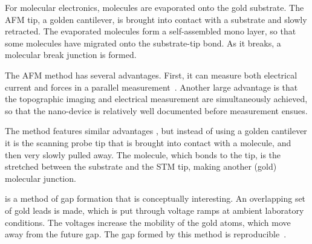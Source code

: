 For molecular electronics, molecules are evaporated onto the gold substrate. The AFM tip, a golden cantilever, is brought into contact with a substrate and slowly retracted. The evaporated molecules form a self-assembled mono layer, so that some molecules have migrated onto the substrate-tip bond. As it breaks, a molecular break junction is formed.

The AFM method has several advantages. First, it can measure both electrical current and forces in a parallel measurement~\cite{nef}. Another large advantage is that the topographic imaging and electrical measurement are simultaneously achieved, so that the nano-device is relatively well documented before measurement ensues.

The  method features similar advantages \cite{Joachim2000}, but instead of using a golden cantilever it is the scanning probe tip that is brought into contact with a molecule, and then very slowly pulled away. The molecule, which bonds to the tip, is the stretched between the substrate and the STM tip, making another (gold) molecular junction.

 is a method of gap formation that is conceptually interesting. An overlapping set of gold leads is made, which is put through voltage ramps at ambient laboratory conditions. The voltages increase the mobility of the gold atoms, which move away from the future gap. The gap formed by this method is reproducible~\cite{electromigration}.

